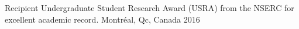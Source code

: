 \begin{cvhonors}
  \cvhonor
    {Recipient}
    {Undergraduate Student Research Award (USRA) from the NSERC for excellent academic record.}
    {Montr\'eal, Qc, Canada}
    {2016}

\end{cvhonors}
